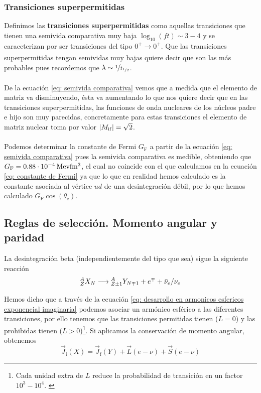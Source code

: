 \subsubsection{Transiciones superpermitidas}
 Definimos las \textbf{transiciones superpermitidas} como aquellas transiciones que tienen una semivida comparativa muy baja $\log_{10}(ft)\sim 3-4$ y se caraceterizan por ser transiciones del tipo $0^+\xrightarrow[]{} 0^+$. Que las transiciones superpermitidas tengan semividas muy bajas quiere decir que son las más probables pues recordemos que $\lambda \sim \nicefrac{1}{t_{\nicefrac{1}{2}}}$.\\\\
De la ecuación \ref{eq: semivida comparativa} vemos que a medida que el elemento de matriz va disminuyendo, ésta va aumentando lo que nos quiere decir que en las transiciones superpermitidas, las funciones de onda nucleares de los núcleos padre e hijo son muy parecidas, concretamente para estas transiciones el elemento de matriz nuclear toma por valor $\abs{M_\mathrm{if}}=\sqrt{2}$. \\\\
Podemos determinar la constante de Fermi $G_\mathrm{F}$ a partir de la ecuación \ref{eq: semivida comparativa} pues la semivida comparativa es medible, obteniendo que $G_\mathrm{F}=\unit[0.88\cdot 10^{-4}]{Mev fm^{3}}$, el cual no coincide con el que calculamos en la ecuación \ref{eq: constante de Fermi} ya que lo que en realidad hemos calculado es la constante asociada al vértice $ud$ de una desintegración débil, por lo que hemos calculado $G_\mathrm{F}\cos(\theta_\mathrm{c})$.

\subsection{Reglas de selección. Momento angular y paridad}
La desintegración beta (independientemente del tipo que sea) sigue la siguiente reacción
\begin{equation*}
      ^A _Z X_N \longrightarrow {}^{A} _{Z\pm1} Y_{N\mp1}+e^\mp+\Bar{\nu}_e/\nu_e
\end{equation*}

Hemos dicho que a través de la ecuación \ref{eq: desarrollo en armonicos esfericos exponencial imaginaria} podemos asociar un armónico esférico a las diferentes transiciones, por ello tenemos que las transiciones permitidas tienen ($L=0$) y las prohibidas tienen ($L>0$)\footnote{Cada unidad extra de $L$ reduce la probabilidad de transición en un factor $10^3-10^4$. \label{footnote: probabilidad momento angular}}. Si aplicamos la conservación de momento angular, obtenemos
\begin{equation}
    \vec{J}_\mathrm{i}(X)= \vec{J}_\mathrm{f}(Y)+\vec{L}(e-\nu)+\vec{S}(e-\nu)
    \label{eq: conservacion momento angular desintegracion beta}
\end{equation}

